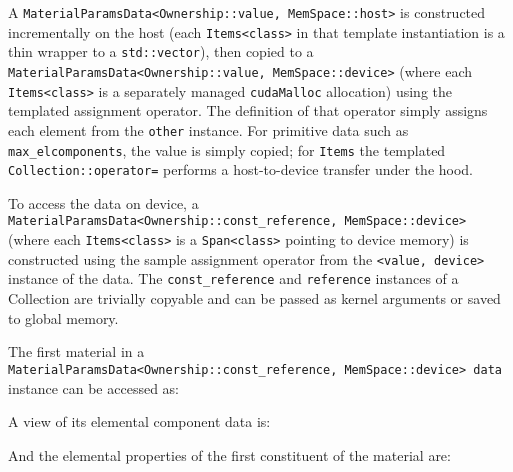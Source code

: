 A
\texttt{MaterialParamsData\textless{}Ownership::value,\ MemSpace::host\textgreater{}}
is constructed incrementally on the host (each
\texttt{Items\textless{}class\textgreater{}} in that template
instantiation is a thin wrapper to a \texttt{std::vector}), then copied
to a
\texttt{MaterialParamsData\textless{}Ownership::value,\ MemSpace::device\textgreater{}}
(where each \texttt{Items\textless{}class\textgreater{}} is a separately
managed \texttt{cudaMalloc} allocation) using the templated assignment
operator. The definition of that operator simply assigns each element
from the \texttt{other} instance. For primitive data such as
\texttt{max\_elcomponents}, the value is simply copied; for
\texttt{Items} the templated \texttt{Collection::operator=} performs a
host-to-device transfer under the hood.

To access the data on device, a
\texttt{MaterialParamsData\textless{}Ownership::const\_reference,\ MemSpace::device\textgreater{}}
(where each \texttt{Items\textless{}class\textgreater{}} is a
\texttt{Span\textless{}class\textgreater{}} pointing to device memory)
is constructed using the sample assignment operator from the
\texttt{\textless{}value,\ device\textgreater{}} instance of the data.
The \texttt{const\_reference} and \texttt{reference} instances of a
Collection are trivially copyable and can be passed as kernel arguments
or saved to global memory.

The first material in a
\texttt{MaterialParamsData\textless{}Ownership::const\_reference,\ MemSpace::device\textgreater{}\ data}
instance can be accessed as:
\begin{Shaded}
\begin{Highlighting}[]
\NormalTok{ Material\& m = data.materials[ItemId\textless{}Material\textgreater{}(}\NormalTok{)];}
\end{Highlighting}
\end{Shaded}
%
A view of its elemental component data is:
%
\begin{Shaded}
\begin{Highlighting}[]
\end{Highlighting}
\end{Shaded}
%
And the elemental properties of the first constituent of the material
are:
%
\begin{Shaded}
\begin{Highlighting}[]
\end{Highlighting}
\end{Shaded}

